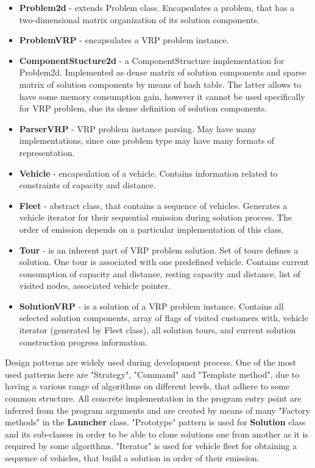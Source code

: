 \documentclass[11pt,a4paper,oneside]{book}
\begin{document}
\begin{itemize}
\item \textbf{Problem2d} - extends Problem class. Encapsulates a problem, that has a two-dimensional matrix organization of its solution components.

\item \textbf{ProblemVRP} - encapsulates a VRP problem instance.

\item \textbf{ComponentStucture2d} - a ComponentStructure implementation for Problem2d. Implemented as dense matrix of solution components and sparse matrix of solution components by means of hash table. The latter allows to have some memory consumption gain, however it cannot be used specifically for VRP problem, due its dense definition of solution components.

\item \textbf{ParserVRP} - VRP problem instance parsing. May have many implementations, since one problem type may have many formats of representation.

\item \textbf{Vehicle} - encapsulation of a vehicle. Contains information related to constraints of capacity and distance.

\item \textbf{Fleet} - abstract class, that contains a sequence of vehicles. Generates a vehicle iterator for their sequential emission during solution process. The order of emission depends on a particular implementation of this class.

\item \textbf{Tour} - is an inherent part of VRP problem solution. Set of tours defines a solution. One tour is associated with one predefined vehicle. Contains current consumption of capacity and distance, resting capacity and distance, list of visited nodes, associated vehicle pointer.

\item \textbf{SolutionVRP} - is a solution of a VRP problem instance. Contains all selected solution components, array of flags of visited customers with, vehicle iterator (generated by Fleet class), all solution tours, and current solution construction progress information.

\end{itemize}



Design patterns are widely used during development process. One of the most used patterns here are "Strategy", "Command" and "Template method", due to having a various range of algorithms on different levels, that adhere to some common structure. All concrete implementation in the program entry point are inferred from the program arguments and are created by means of many "Factory methods" in the \textbf{Launcher} class. "Prototype" pattern is used for \textbf{Solution} class and its sub-classes in order to be able to clone solutions one from another as it is required by some algorithms. "Iterator" is used for vehicle fleet for obtaining a sequence of vehicles, that build a solution in order of their emission.
\end{document}
